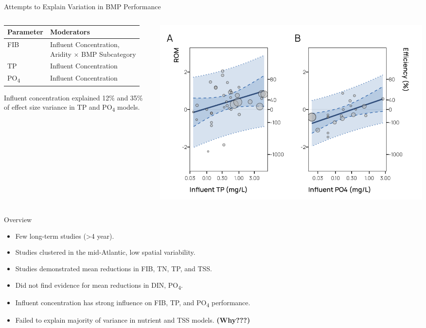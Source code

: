 \documentclass[
  ignorenonframetext,
  aspectratio=169,
]{beamer}
\providecommand{\tightlist}{%
  \setlength{\itemsep}{0pt}\setlength{\parskip}{0pt}}\usepackage{longtable,booktabs,array}
\begin{document}
\begin{frame}{Attempts to Explain Variation in BMP Performance}
\label{attempts-to-explain-variation-in-bmp-performance-1}
\begin{columns}[T]
\begin{column}{0.5\textwidth}
\begin{tabular}[t]{l|l}
\hline
Parameter & Moderators\\
\hline
FIB & \makecell[l]{Influent Concentration,\\Aridity × BMP Subcategory}\\
\hline
TP & Influent Concentration\\
\hline
PO\textsubscript{4} & Influent Concentration\\
\hline
\end{tabular}

Influent concentration explained 12\% and 35\% of effect size variance
in TP and PO\textsubscript{4} models.
\end{column}

\begin{column}{0.5\textwidth}
\includegraphics[width=1\textwidth,height=\textheight]{Schramm-UCOWR-2024_files/figure-beamer/p6-1.png}
\end{column}
\end{columns}
\end{frame}

\begin{frame}{Overview}
\label{overview}
\begin{itemize}
\tightlist
\item
  Few long-term studies (\textgreater4 year).
\item
  Studies clustered in the mid-Atlantic, low spatial variability.
\item
  Studies demonstrated mean reductions in FIB, TN, TP, and TSS.
\item
  Did not find evidence for mean reductions in DIN, PO\textsubscript{4}.
\item
  Influent concentration has strong influence on FIB, TP, and
  PO\textsubscript{4} performance.
\item
  Failed to explain majority of variance in nutrient and TSS models.
  \textbf{(Why???)}
\end{itemize}
\end{frame}
\end{document}
